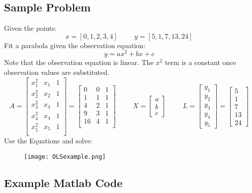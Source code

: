 \subsection{Sample Problem}
Given the points: 
\[
x = [0,1,2,3,4] \hspace{1cm} y = [5,1,7,13,24]
\]
Fit a parabola given the observation equation:
\[
y = a x^2 +b x + c
\]
Note that the observation equation is linear. The $x^2$ term is a constant once observation values are substituted.
\[
A = \begin{bmatrix}
x_1^2 & x_1 & 1 \\
x_2^2 & x_2 & 1 \\
x_3^2 & x_3 & 1 \\
x_4^2 & x_4 & 1 \\
x_5^2 & x_5 & 1 \\
\end{bmatrix} =
\begin{bmatrix}
0 & 0 & 1 \\
1 & 1 & 1 \\
4 & 2 & 1 \\
9 & 3 & 1 \\
16 & 4 & 1 \\
\end{bmatrix}
\hspace{1cm}
X = 
\begin{bmatrix}
a \\ b \\ c 
\end{bmatrix}
\hspace{1cm}
L =
\begin{bmatrix}
y_1 \\ y_2 \\ y_3 \\ y_4 \\ y_5
\end{bmatrix} = 
\begin{bmatrix}
5 \\ 1 \\ 7 \\ 13 \\ 24
\end{bmatrix}
\]
Use the Equations and solve:


\begin{figure}[H]
	\centering
	\texttt{[image: OLSexample.png]}
\end{figure}

\subsection{Example Matlab Code}


